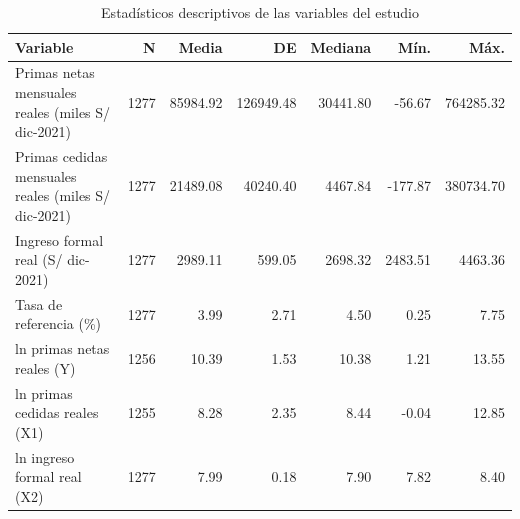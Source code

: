 \begin{table}[htbp]
\caption{Estadísticos descriptivos de las variables del estudio}
\label{tab:tabla_1_descriptivos}
\begin{tabular}{lrrrrrr}
\toprule
Variable & N & Media & DE & Mediana & Mín. & Máx. \\
\midrule
Primas netas mensuales reales (miles S/ dic-2021) & 1277 & 85984.92 & 126949.48 & 30441.80 & -56.67 & 764285.32 \\
Primas cedidas mensuales reales (miles S/ dic-2021) & 1277 & 21489.08 & 40240.40 & 4467.84 & -177.87 & 380734.70 \\
Ingreso formal real (S/ dic-2021) & 1277 & 2989.11 & 599.05 & 2698.32 & 2483.51 & 4463.36 \\
Tasa de referencia (\%) & 1277 & 3.99 & 2.71 & 4.50 & 0.25 & 7.75 \\
ln primas netas reales (Y) & 1256 & 10.39 & 1.53 & 10.38 & 1.21 & 13.55 \\
ln primas cedidas reales (X1) & 1255 & 8.28 & 2.35 & 8.44 & -0.04 & 12.85 \\
ln ingreso formal real (X2) & 1277 & 7.99 & 0.18 & 7.90 & 7.82 & 8.40 \\
\bottomrule
\end{tabular}
\par{}
\end{table}
